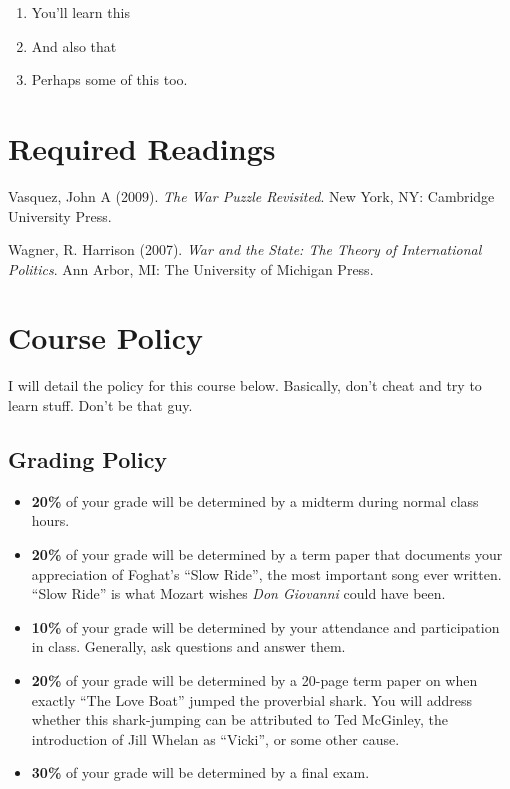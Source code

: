 \documentclass[11pt,]{article}
\begin{document}
\begin{enumerate}
\def\labelenumi{\arabic{enumi}.}
\item
  You'll learn this
\item
  And also that
\item
  Perhaps some of this too.
\end{enumerate}

\hypertarget{required-readings}{%
\section{Required Readings}\label{required-readings}}

Vasquez, John A (2009). \emph{The War Puzzle Revisited}. New York, NY:
Cambridge University Press.

Wagner, R. Harrison (2007).
\emph{War and the State: The Theory of International Politics}. Ann
Arbor, MI: The University of Michigan Press.

\hypertarget{course-policy}{%
\section{Course Policy}\label{course-policy}}

I will detail the policy for this course below. Basically, don't cheat
and try to learn stuff. Don't be that guy.

\hypertarget{grading-policy}{%
\subsection{Grading Policy}\label{grading-policy}}

\begin{itemize}
\item
  \textbf{20\%} of your grade will be determined by a midterm during
  normal class hours.
\item
  \textbf{20\%} of your grade will be determined by a term paper that
  documents your appreciation of Foghat's ``Slow Ride'', the most
  important song ever written. ``Slow Ride'' is what Mozart wishes
  \emph{Don Giovanni} could have been.
\item
  \textbf{10\%} of your grade will be determined by your attendance and
  participation in class. Generally, ask questions and answer them.
\item
  \textbf{20\%} of your grade will be determined by a 20-page term paper
  on when exactly ``The Love Boat'' jumped the proverbial shark. You
  will address whether this shark-jumping can be attributed to Ted
  McGinley, the introduction of Jill Whelan as ``Vicki'', or some other
  cause.
\item
  \textbf{30\%} of your grade will be determined by a final exam.
\end{itemize}
\end{document}
